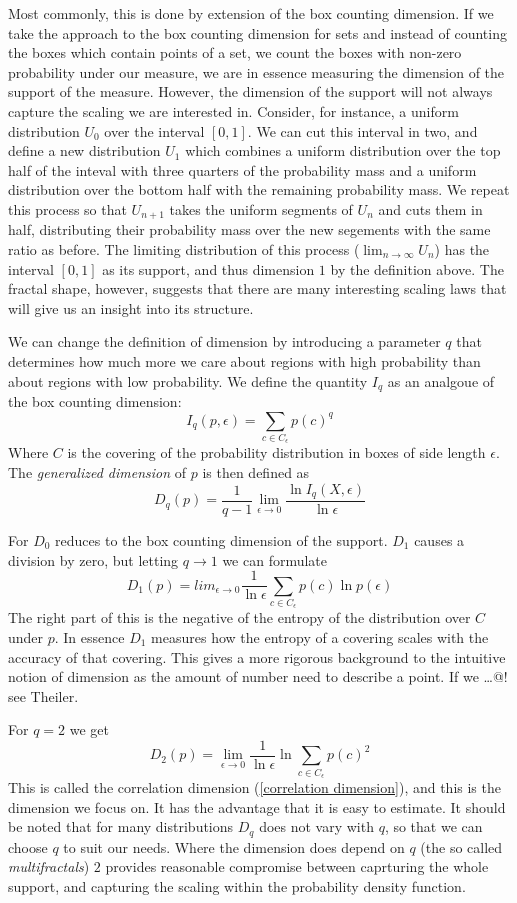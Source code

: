 \documentclass[11pt]{article}
\begin{document}
Most commonly, this is done by extension of the box counting dimension. If we take the approach to the box counting dimension for sets and instead of counting the boxes which contain points of a set, we count the boxes with non-zero probability under our measure, we are in essence measuring the dimension of the support of the measure. However, the dimension of the support will not always capture the scaling we are interested in. Consider, for instance, a uniform distribution $U_0$ over the interval $[0, 1]$. We can cut this interval in two, and define a new distribution $U_1$ which combines a uniform distribution over the top half of the inteval with three quarters of the probability mass and a uniform distribution over the bottom half with the remaining probability mass. We repeat this process so that $U_{n+1}$ takes the uniform segments of $U_n$ and cuts them in half, distributing their probability mass over the new segements with the same ratio as before. The limiting distribution of this process ($\lim_{n \rightarrow \infty} U_n$) has the interval $[0, 1]$ as its support, and thus dimension $1$ by the definition above. The fractal shape, however, suggests that there are many interesting scaling laws that will give us an insight into its structure.

We can change the definition of dimension by introducing a parameter $q$ that determines how much more we care about regions with high probability than about regions with low probability. We define the quantity $I_q$ as an analgoue of the box counting dimension:
\[
I_q(p, \epsilon) = \sum_{c \in C_\epsilon}p(c)^q 
\]
Where $C$ is the covering of the probability distribution in boxes of side length $\epsilon$. The \textit{generalized dimension} of $p$ is then defined as
\[
D_q(p) = \frac{1}{q-1} \lim_{\epsilon \rightarrow 0} \frac{\ln I_q(X, \epsilon)}{\ln \epsilon}
\]

For $D_0$ reduces to the box counting dimension of the support. $D_1$ causes a division by zero, but letting $q \rightarrow 1$ we can formulate 
\[
D_1(p) = lim_{\epsilon \rightarrow 0} \frac{1}{\ln \epsilon} \sum_{c \in C_\epsilon} p(c) \ln p(\epsilon)
\] 
The right part of this is the negative of the entropy of the distribution over $C$ under $p$. In essence $D_1$ measures how the entropy of a covering scales with the accuracy of that covering. This gives a more rigorous background to the intuitive notion of dimension as the amount of number need to describe a point. If we \ldots @! see Theiler.

For $q = 2$ we get 
\[
D_2(p) = \lim_{\epsilon \rightarrow 0} \frac{1}{\ln \epsilon}\ln \sum_{c \in C_\epsilon} {p(c)^2}
\]
This is called the correlation dimension (\ref{correlation dimension}), and this is the dimension we focus on. It has the advantage that it is easy to estimate. It should be noted that for many distributions $D_q$ does not vary with $q$, so that we can choose $q$ to suit our needs. Where the dimension does depend on $q$ (the so called \textit{multifractals}) $2$ provides reasonable compromise between caprturing the whole support, and capturing the scaling within the probability density function.
\end{document}
